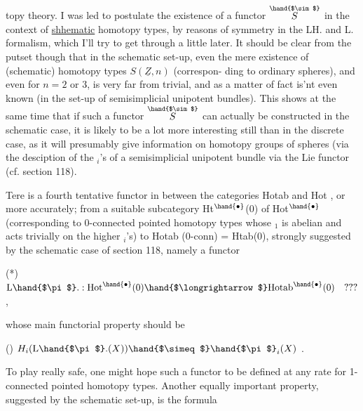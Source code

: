 
topy theory.   I was led to postulate the existence of a functor $\overset{\hand{$\sim$}}{S}$  in
the context of \uline{shhematic} homotopy types,  by reasons of symmetry in the
LH.  and L\hand{$\pi$}. formalism,  which I'll try to get through a little later.
It should be clear from the putset though that in the schematic set-up,
even the mere existence of (schematic) homotopy types $S(\underline{Z},n)$  (correspon-%
ding to ordinary spheres),  and  even for $n=2$ or $3$, is very far from
trivial,  and as a matter of fact is'nt even known (in the set-up of
semisimplicial unipotent bundles).  This shows at the same time that if
such a functor $\overset{\hand{$\sim$}}{S}$ can actually be constructed in the schematic case,  it is
likely to be a lot more interesting still than in the discrete case,  as
it will presumably give information on homotopy groups of spheres (via the
desciption of the \hand{$\pi$}$_i$'s  of a semisimplicial unipotent bundle via the Lie
functor  (cf. section 118)\hand{)}.

Tere  is a fourth tentative functor in between the categories
Hotab  and  Hot ,  or more accurately;  from a suitable subcategory
Ht$^\hand{\bullet}$(0)  of Hot$^\hand{\bullet}$  (corresponding to 0-connected pointed homotopy types
whose \hand{$\pi$}$_1$ is abelian and acts trivially on the higher \hand{$\pi$}$_i$'s) to
Hotab (0-conn) = Htab(0),  strongly suggested by the schematic case of
section 118,  namely a functor

(*) \qquad $\mathrm{L}\hand{$\pi$}. : \mathrm{Hot}^\hand{\bullet}(0) \hand{$\longrightarrow$} \mathrm{Hotab}^\hand{\bullet}(0) \quad ???$  ,

whose main functorial property should be

() \qquad $H_i(\mathrm{L}\hand{$\pi$}.(X)) \hand{$\simeq$} \hand{$\pi$}_i(X)$ \quad {} .

To play really safe,  one might hope such a functor to be defined at any
rate for 1-connected pointed homotopy types.  Another equally important
property, suggested by the schematic set-up, is the formula

